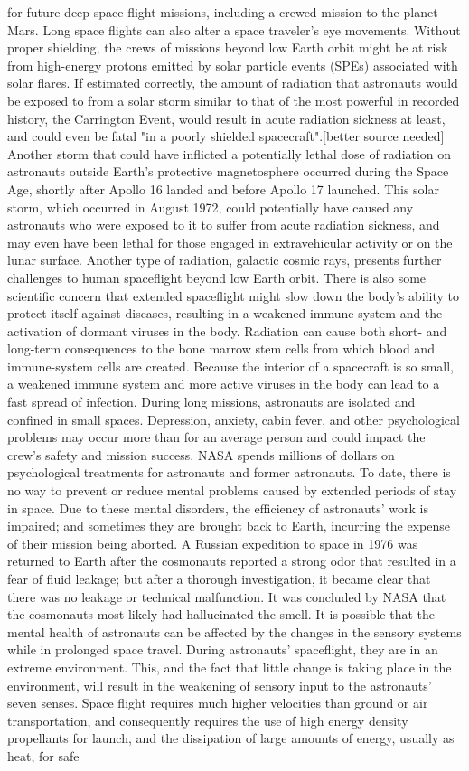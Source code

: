 \documentclass[12pt]{article}
\begin{document}
for future deep space flight missions, including a crewed mission to the planet Mars. Long space flights can also alter a space traveler's eye movements. Without proper shielding, the crews of missions beyond low Earth orbit might be at risk from high-energy protons emitted by solar particle events (SPEs) associated with solar flares. If estimated correctly, the amount of radiation that astronauts would be exposed to from a solar storm similar to that of the most powerful in recorded history, the Carrington Event, would result in acute radiation sickness at least, and could even be fatal "in a poorly shielded spacecraft".[better source needed] Another storm that could have inflicted a potentially lethal dose of radiation on astronauts outside Earth's protective magnetosphere occurred during the Space Age, shortly after Apollo 16 landed and before Apollo 17 launched. This solar storm, which occurred in August 1972, could potentially have caused any astronauts who were exposed to it to suffer from acute radiation sickness, and may even have been lethal for those engaged in extravehicular activity or on the lunar surface. Another type of radiation, galactic cosmic rays, presents further challenges to human spaceflight beyond low Earth orbit. There is also some scientific concern that extended spaceflight might slow down the body's ability to protect itself against diseases, resulting in a weakened immune system and the activation of dormant viruses in the body. Radiation can cause both short- and long-term consequences to the bone marrow stem cells from which blood and immune-system cells are created. Because the interior of a spacecraft is so small, a weakened immune system and more active viruses in the body can lead to a fast spread of infection. During long missions, astronauts are isolated and confined in small spaces. Depression, anxiety, cabin fever, and other psychological problems may occur more than for an average person and could impact the crew's safety and mission success. NASA spends millions of dollars on psychological treatments for astronauts and former astronauts. To date, there is no way to prevent or reduce mental problems caused by extended periods of stay in space. Due to these mental disorders, the efficiency of astronauts' work is impaired; and sometimes they are brought back to Earth, incurring the expense of their mission being aborted. A Russian expedition to space in 1976 was returned to Earth after the cosmonauts reported a strong odor that resulted in a fear of fluid leakage; but after a thorough investigation, it became clear that there was no leakage or technical malfunction. It was concluded by NASA that the cosmonauts most likely had hallucinated the smell. It is possible that the mental health of astronauts can be affected by the changes in the sensory systems while in prolonged space travel. During astronauts' spaceflight, they are in an extreme environment. This, and the fact that little change is taking place in the environment, will result in the weakening of sensory input to the astronauts' seven senses. Space flight requires much higher velocities than ground or air transportation, and consequently requires the use of high energy density propellants for launch, and the dissipation of large amounts of energy, usually as heat, for safe 
\end{document}
